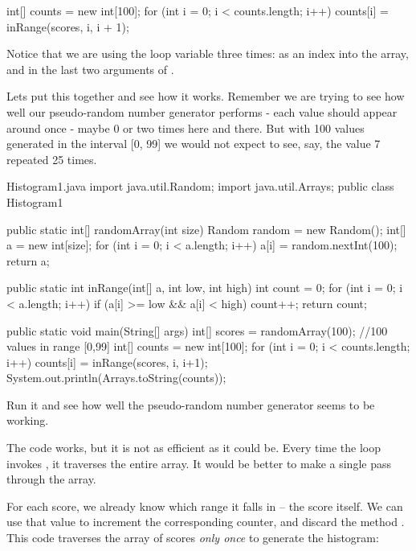 \begin{code}
int[] counts = new int[100];
for (int i = 0; i < counts.length; i++) {
    counts[i] = inRange(scores, i, i + 1);
}
\end{code}

Notice that we are using the loop variable  three times: as an index into the  array, and in the last two arguments of .

Lets put this together and see how it works.  Remember we are trying to see how well our pseudo-random number generator performs - each value should appear around once - maybe 0 or two times here and there.  But with 100 values generated in the interval [0, 99] we would not expect to see, say, the value 7 repeated 25 times.

\begin{trinket} [500] {Histogram1.java}
import java.util.Random;
import java.util.Arrays;
public class Histogram1 {

    public static int[] randomArray(int size) {
        Random random = new Random();
        int[] a = new int[size];
        for (int i = 0; i < a.length; i++) {
            a[i] = random.nextInt(100);
        }
        return a;
    }  
    
    public static int inRange(int[] a, int low, int high) {
        int count = 0;
        for (int i = 0; i < a.length; i++) {
           if (a[i] >= low && a[i] < high) {
               count++;
           }
        }
        return count;
    }
       
    public static void main(String[] args) {
       int[] scores = randomArray(100); //100 values in range [0,99]
       int[] counts = new int[100];
       for (int i = 0; i < counts.length; i++) {
          counts[i] = inRange(scores, i, i+1);
       }
       System.out.println(Arrays.toString(counts));             
    }
}
\end{trinket}

Run it and see how well the pseudo-random number generator seems to be working.


The code works, but it is not as efficient as it could be.
Every time the loop invokes , it traverses the entire array.
It would be better to make a single pass through the  array.

For each score, we already know which range it falls in -- the score itself.
We can use that value to increment the corresponding counter, and discard the method .
This code traverses the array of scores {\em only once} to generate the histogram:

